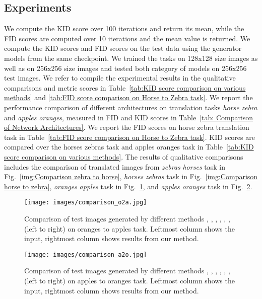 \documentclass[a4paper,twoside]{article}
\begin{document}
\subsection{Experiments}
\noindent
We compute the KID score over 100 iterations and return its mean, while the FID scores are computed over 10 iterations and the mean value is returned. We compute the KID scores and FID scores on the test data using the generator models from the same checkpoint. We trained the tasks on 128x128 size images as well as on 256x256 size images and tested both category of models on 256x256 test images. We refer \cite{attentionGAN} to compile the experimental results in the qualitative comparisons and metric scores in Table~\ref{tab:KID score comparison on various methods} and \ref{tab:FID score comparison on Horse to Zebra task}. We report the performance comparison of different architectures on translation tasks \textit{horse}  \textit{zebra} and \textit{apples}  \textit{oranges}, measured in FID and KID scores in Table~\ref{tab: Comparison of Network Architectures}. We report the FID scores on horse  zebra translation task in Table~\ref{tab:FID score comparison on Horse to Zebra task}. KID scores are compared over the horses  zebras task and apples  oranges task in Table~\ref{tab:KID score comparison on various methods}. The results of qualitative comparisons includes the comparison of translated images from \textit{zebras}  \textit{horses} task in Fig.~\ref{img:Comparison zebra to horse}, \textit{horses}  \textit{zebras} task in Fig.~\ref{img:Comparison horse to zebra},
\textit{oranges}  \textit{apples} task in Fig.~\ref{img:Comparison oranges to apples}, and \textit{apples}  \textit{oranges} task in Fig.~\ref{img:Comparison apples to oranges}.
\begin{figure}[!ht] \small
\centering
\texttt{[image: images/comparison\_o2a.jpg]}
\caption{Comparison of test images generated by different methods \cite{CycleGAN2017}, \cite{Residual-Attention_WangJQYLZWT17}, \cite{DiscoGAN_KimCKLK17}, \cite{UNIT_LiuBK17}, \cite{DualGAN_YiZTG17}, \cite{Mejjati2018UAIT}, \cite{attentionGAN} (left to right) on oranges to apples task. Leftmost column shows the input, rightmost column shows results from our method.
}
\label{img:Comparison oranges to apples}
\end{figure}
\begin{figure}[!ht] \small
\centering
\texttt{[image: images/comparison\_a2o.jpg]}
\caption{Comparison of test images generated by different methods \cite{CycleGAN2017}, \cite{Residual-Attention_WangJQYLZWT17}, \cite{DiscoGAN_KimCKLK17}, \cite{UNIT_LiuBK17}, \cite{DualGAN_YiZTG17}, \cite{Mejjati2018UAIT}, \cite{attentionGAN} (left to right) on apples to oranges task. Leftmost column shows the input, rightmost column shows results from our method.
}
\label{img:Comparison apples to oranges}
\end{figure}
\end{document}
